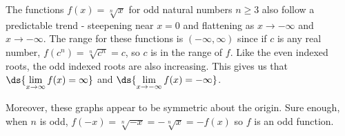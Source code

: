 \documentclass{ximera}
\begin{document}






The functions $f(x) = \sqrt[n]{x}$ for odd natural numbers $n \geq 3$ also follow a predictable trend - steepening near $x = 0$ and flattening as $x \rightarrow -\infty$ and $x \rightarrow -\infty$.  The range for these functions is $(-\infty, \infty)$ since if $c$ is any real number, $f(c^n) = \sqrt[n]{c^n} = c$, so $c$ is in the range of $f$.  Like the even indexed roots, the odd indexed roots are also increasing.  This gives us that $\ds{\lim_{x \rightarrow \infty} f(x) = \infty}$ and $\ds{\lim_{x \rightarrow -\infty} f(x) = -\infty}$.  

Moreover, these graphs appear to be symmetric about the origin.  Sure enough, when $n$ is odd,  $f(-x) = \sqrt[n]{-x} = -\sqrt[n]{x} = -f(x)$ so $f$ is an odd function.








\end{document}
